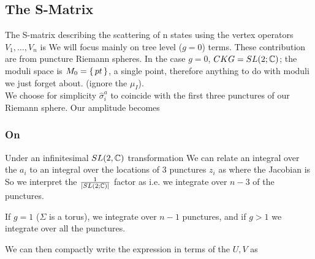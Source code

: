 \documentclass{article}
\begin{document}
\subsection{The S-Matrix}
The S-matrix describing the scattering of n states using the vertex operators $V_1, \dots, V_n$ is 
We will focus mainly on tree level ($g=0$) terms. These contribution are from puncture Riemann spheres. In the case $g=0$, $CKG = SL(2;\mathbb{C})$; the moduli space is $M_0 = \set{pt}$, a single point, therefore anything to do with moduli we just forget about. (ignore the $\mu_I$).\\
We choose for simplicity $\hat{\sigma}^a_i$ to coincide with the first three punctures of our Riemann sphere. Our amplitude becomes 
\subsubsection*{On }
Under an infinitesimal $SL(2,\mathbb{C})$ transformation 
We can relate an integral over the $a_i$ to an integral over the locations of 3 punctures $z_i$ as 
where the Jacobian is 
So we interpret the $\frac{1}{\left\lvert SL(2;\mathbb{C}) \right\rvert}$ factor as 
i.e. we integrate over $n-3$ of the punctures. 
\begin{remark}
If $g=1$ ($\Sigma$ is a torus), we integrate over $n-1$ punctures, and if $g>1$ we integrate over all the punctures. 
\end{remark}
We can then compactly write the expression in terms of the $U,V$ as 
\end{document}
